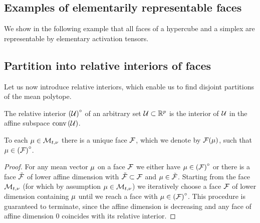 \subsection{Examples of elementarily representable faces}

We show in the following example that all faces of a hypercube and a simplex are representable by elementary activation tensors.





\subsection{Partition into relative interiors of faces}

Let us now introduce relative interiors, which enable us to find disjoint partitions of the mean polytope.

\begin{definition}
    \label{def:relativeInterior}
    The relative interior ${\left(\mathcal{U}\right)}^{\circ}$ of an arbitrary set $\mathcal{U}\subset\mathbb{R}^{p}$ is the interior of $\mathcal{U}$ in the affine subspace $\mathrm{conv}\left(\mathcal{U}\right)$.
\end{definition}

\begin{lemma}
    \label{lem:faceToMean}
    To each $\mu\in\mathcal{M}_{t,\nu}$ there is a unique face $\mathcal{F}$, which we denote by $\mathcal{F}(\mu)$, such that $\mu\in{\left(\mathcal{F}\right)}^{\circ}$.
\end{lemma}
\begin{proof}
    For any mean vector $\mu$ on a face $\mathcal{F}$ we either have $\mu\in{\left(\mathcal{F}\right)}^{\circ}$ or there is a face $\tilde{\mathcal{F}}$ of lower affine dimension with $\tilde{\mathcal{F}}\subset\mathcal{F}$ and $\mu\in\tilde{\mathcal{F}}$.
    Starting from the face $\mathcal{M}_{t,\nu}$ (for which by assumption $\mu\in\mathcal{M}_{t,\nu}$) we iteratively choose a face $\mathcal{F}$ of lower dimension containing $\mu$ until we reach a face with $\mu\in{\left(\mathcal{F}\right)}^{\circ}$.
    This procedure is guaranteed to terminate, since the affine dimension is decreasing and any face of affine dimension $0$ coincides with its relative interior.
\end{proof}


